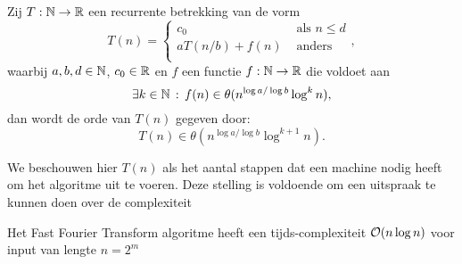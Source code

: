 \begin{stelling}
    Zij $T:\mathbb{N}\to\mathbb{R}$ een recurrente betrekking van de vorm
    \[
    T(n) = \begin{cases}
      c_0 &\text{ als } n \leq d \\
      a T(n/b) + f(n) &\text{ anders} \\
    \end{cases},
    \]
    waarbij $a,b,d\in\mathbb{N}$, $c_0\in\mathbb{R}$ en $f$ een functie $f:\mathbb{N}\rightarrow\mathbb{R}$ die voldoet aan 
    \[
    \exists k \in \mathbb{N} \,:\, f(n) \in \theta(n^{\log a/\log b} \log^k n),
    \]
    dan wordt de orde van $T(n)$ gegeven door:
    \[
      T(n) \in \theta(n^{\log a / \log b} \log^{k+1}n).
    \]
\end{stelling}
We beschouwen hier $T(n)$ als het aantal stappen dat een machine nodig heeft om het algoritme uit te voeren.
Deze stelling is voldoende om een uitspraak te kunnen doen over de complexiteit 
\begin{stelling}
  Het Fast Fourier Transform algoritme heeft een tijds-complexiteit $\mathcal{O}(n\log n)$ voor input van lengte $n=2^m$ 
\end{stelling} 
